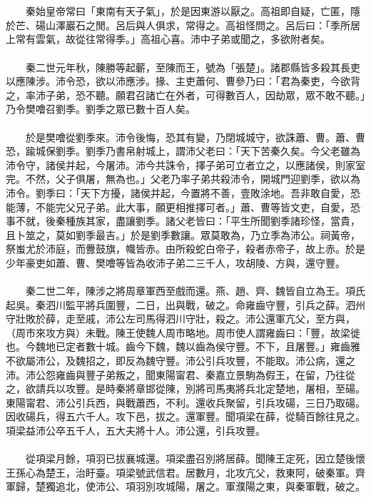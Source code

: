 \\\\
　　秦始皇帝常曰「東南有天子氣」，於是因東游以厭之。高祖即自疑，亡匿，隱於芒、碭山澤巖石之閒。呂后與人俱求，常得之。高祖怪問之。呂后曰：「季所居上常有雲氣，故從往常得季。」高祖心喜。沛中子弟或聞之，多欲附者矣。
\\\\
　　秦二世元年秋，陳勝等起蘄，至陳而王，號為「張楚」。諸郡縣皆多殺其長吏以應陳涉。沛令恐，欲以沛應涉。掾、主吏蕭何、曹參乃曰：「君為秦吏，今欲背之，率沛子弟，恐不聽。願君召諸亡在外者，可得數百人，因劫眾，眾不敢不聽。」乃令樊噲召劉季。劉季之眾已數十百人矣。
\\\\
　　於是樊噲從劉季來。沛令後悔，恐其有變，乃閉城城守，欲誅蕭、曹。蕭、曹恐，踰城保劉季。劉季乃書帛射城上，謂沛父老曰：「天下苦秦久矣。今父老雖為沛令守，諸侯并起，今屠沛。沛今共誅令，擇子弟可立者立之，以應諸侯，則家室完。不然，父子俱屠，無為也。」父老乃率子弟共殺沛令，開城門迎劉季，欲以為沛令。劉季曰：「天下方擾，諸侯并起，今置將不善，壹敗涂地。吾非敢自愛，恐能薄，不能完父兄子弟。此大事，願更相推擇可者。」蕭、曹等皆文吏，自愛，恐事不就，後秦種族其家，盡讓劉季。諸父老皆曰：「平生所聞劉季諸珍怪，當貴，且卜筮之，莫如劉季最吉。」於是劉季數讓。眾莫敢為，乃立季為沛公。祠黃帝，祭蚩尤於沛庭，而釁鼓旗，幟皆赤。由所殺蛇白帝子，殺者赤帝子，故上赤。於是少年豪吏如蕭、曹、樊噲等皆為收沛子弟二三千人，攻胡陵、方與，還守豐。
\\\\
　　秦二世二年，陳涉之將周章軍西至戲而還。燕、趙、齊、魏皆自立為王。項氏起吳。秦泗川監平將兵圍豐，二日，出與戰，破之。命雍齒守豐，引兵之薛。泗州守壯敗於薛，走至戚，沛公左司馬得泗川守壯，殺之。沛公還軍亢父，至方與，（周市來攻方與）未戰。陳王使魏人周市略地。周市使人謂雍齒曰：「豐，故梁徙也。今魏地已定者數十城。齒今下魏，魏以齒為侯守豐。不下，且屠豐。」雍齒雅不欲屬沛公，及魏招之，即反為魏守豐。沛公引兵攻豐，不能取。沛公病，還之沛。沛公怨雍齒與豐子弟叛之，聞東陽甯君、秦嘉立景駒為假王，在留，乃往從之，欲請兵以攻豐。是時秦將章邯從陳，別將司馬夷將兵北定楚地，屠相，至碭。東陽甯君、沛公引兵西，與戰蕭西，不利。還收兵聚留，引兵攻碭，三日乃取碭。因收碭兵，得五六千人。攻下邑，拔之。還軍豐。聞項梁在薛，從騎百餘往見之。項梁益沛公卒五千人，五大夫將十人。沛公還，引兵攻豐。
\\\\
　　從項梁月餘，項羽已拔襄城還。項梁盡召別將居薛。聞陳王定死，因立楚後懷王孫心為楚王，治盱臺。項梁號武信君。居數月，北攻亢父，救東阿，破秦軍。齊軍歸，楚獨追北，使沛公、項羽別攻城陽，屠之。軍濮陽之東，與秦軍戰，破之。
\\\\
